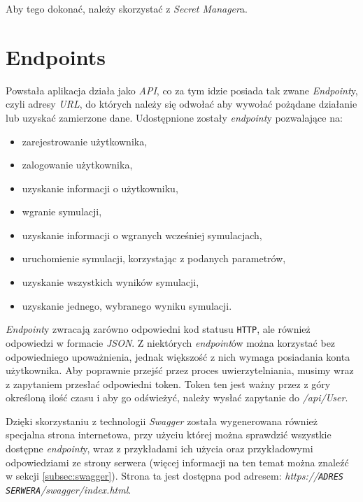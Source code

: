 Aby tego dokonać, należy skorzystać z \emph{Secret Manager}a.\cite{DOTNET_SECRET_MANAGER}

\section{Endpoints}

\par Powstała aplikacja działa jako \emph{API}, co za tym idzie posiada tak zwane \emph{Endpoint}y, czyli adresy \emph{URL}, do których należy się odwołać aby wywołać pożądane działanie lub uzyskać zamierzone dane. Udostępnione zostały \emph{endpoint}y pozwalające na:
\begin{itemize}
	\item zarejestrowanie użytkownika,
	\item zalogowanie użytkownika,
	\item uzyskanie informacji o użytkowniku,
	\item wgranie symulacji,
	\item uzyskanie informacji o wgranych wcześniej symulacjach,
	\item uruchomienie symulacji, korzystając z podanych parametrów,
	\item uzyskanie wszystkich wyników symulacji,
	\item uzyskanie jednego, wybranego wyniku symulacji.
\end{itemize}

\par \emph{Endpoint}y zwracają zarówno odpowiedni kod statusu \texttt{HTTP}, ale również odpowiedzi w formacie \emph{JSON}. Z niektórych \emph{endpoint}ów można korzystać bez odpowiedniego upoważnienia, jednak większość z nich wymaga posiadania konta użytkownika. Aby poprawnie przejść przez proces uwierzytelniania, musimy wraz z zapytaniem przesłać odpowiedni token. Token ten jest ważny przez z góry określoną ilość czasu i aby go odświeżyć, należy wysłać zapytanie do \emph{/api/User}.

\par Dzięki skorzystaniu z technologii \emph{Swagger} została wygenerowana również specjalna strona internetowa, przy użyciu której można sprawdzić wszystkie dostępne \emph{endpoint}y, wraz z przykładami ich użycia oraz przykładowymi odpowiedziami ze strony serwera (więcej informacji na ten temat można znaleźć w sekcji \ref{subsec:swagger}). Strona ta jest dostępna pod adresem: \emph{https://\texttt{ADRES SERWERA}/swagger/index.html}.

